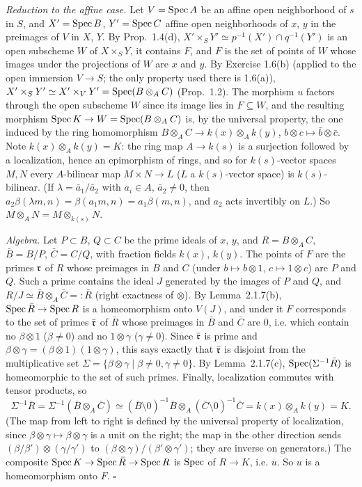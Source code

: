 \documentclass[11pt]{article}
\begin{document}
\emph{Reduction to the affine case.} Let $V=\operatorname{Spec} A$ be an affine open neighborhood of $s$ in $S$, and $X'=\operatorname{Spec} B$, $Y'=\operatorname{Spec} C$ affine open neighborhoods of $x$, $y$ in the preimages of $V$ in $X$, $Y$. By Prop.~1.4(d), $X'\times_SY'\simeq p^{-1}(X')\cap q^{-1}(Y')$ is an open subscheme $W$ of $X\times_SY$, it contains $F$, and $F$ is the set of points of $W$ whose images under the projections of $W$ are $x$ and $y$. By Exercise 1.6(b) (applied to the open immersion $V\to S$; the only property used there is 1.6(a)), $X'\times_SY'\simeq X'\times_VY'=\operatorname{Spec}(B\otimes_AC)$ (Prop.~1.2). The morphism $u$ factors through the open subscheme $W$ since its image lies in $F\subseteq W$, and the resulting morphism $\operatorname{Spec} K\to W=\operatorname{Spec}(B\otimes_AC)$ is, by the universal property, the one induced by the ring homomorphism $B\otimes_AC\to k(x)\otimes_Ak(y)$, $b\otimes c\mapsto\bar b\otimes\bar c$. Note $k(x)\otimes_Ak(y)=K$: the ring map $A\to k(s)$ is a surjection followed by a localization, hence an epimorphism of rings, and so for $k(s)$-vector spaces $M,N$ every $A$-bilinear map $M\times N\to L$ ($L$ a $k(s)$-vector space) is $k(s)$-bilinear. (If $\lambda=\bar a_1/\bar a_2$ with $a_i\in A$, $\bar a_2\neq0$, then $a_2\beta(\lambda m,n)=\beta(a_1m,n)=a_1\beta(m,n)$, and $a_2$ acts invertibly on $L$.) So $M\otimes_AN=M\otimes_{k(s)}N$.

\emph{Algebra.} Let $P\subset B$, $Q\subset C$ be the prime ideals of $x$, $y$, and $R=B\otimes_AC$, $\bar B=B/P$, $\bar C=C/Q$, with fraction fields $k(x)$, $k(y)$. The points of $F$ are the primes $\mathfrak r$ of $R$ whose preimages in $B$ and $C$ (under $b\mapsto b\otimes1$, $c\mapsto1\otimes c$) are $P$ and $Q$. Such a prime contains the ideal $J$ generated by the images of $P$ and $Q$, and $R/J\simeq\bar B\otimes_A\bar C=:\bar R$ (right exactness of $\otimes$). By Lemma~2.1.7(b), $\operatorname{Spec}\bar R\to\operatorname{Spec} R$ is a homeomorphism onto $V(J)$, and under it $F$ corresponds to the set of primes $\bar{\mathfrak r}$ of $\bar R$ whose preimages in $\bar B$ and $\bar C$ are $0$, i.e. which contain no $\beta\otimes1$ ($\beta\ne0$) and no $1\otimes\gamma$ ($\gamma\neq0$). Since $\bar{\mathfrak r}$ is prime and $\beta\otimes\gamma=(\beta\otimes1)(1\otimes\gamma)$, this says exactly that $\bar{\mathfrak r}$ is disjoint from the multiplicative set $\Sigma=\{\beta\otimes\gamma\mid\beta\ne0,\gamma\neq0\}$. By Lemma~2.1.7(c), $\operatorname{Spec}(\Sigma^{-1}\bar R)$ is homeomorphic to the set of such primes. Finally, localization commutes with tensor products, so
\[ \Sigma^{-1}\bar R=\Sigma^{-1}(\bar B\otimes_A\bar C)\simeq(\bar B\setminus0)^{-1}\bar B\otimes_A(\bar C\setminus0)^{-1}\bar C=k(x)\otimes_Ak(y)=K. \]
(The map from left to right is defined by the universal property of localization, since $\beta\otimes\gamma\mapsto\beta\otimes\gamma$ is a unit on the right; the map in the other direction sends $(\beta/\beta')\otimes(\gamma/\gamma')$ to $(\beta\otimes\gamma)/(\beta'\otimes\gamma')$; they are inverse on generators.) The composite $\operatorname{Spec} K\to\operatorname{Spec}\bar R\to\operatorname{Spec} R$ is $\operatorname{Spec}$ of $R\to K$, i.e. $u$. So $u$ is a homeomorphism onto $F$. \hfill$\square$
\end{document}
